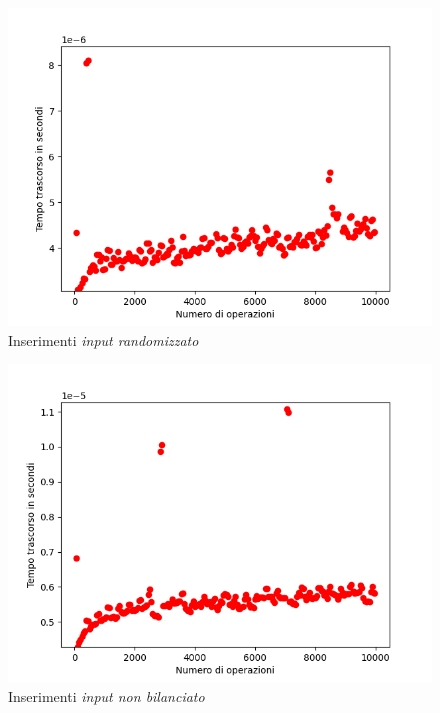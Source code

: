 \documentclass{article}
\begin{document}
			\begin{figure}[h!]
				\centering
				\includegraphics[scale = 0.8]{RBT_Insertions}
				\caption{Inserimenti \textit{input randomizzato}}
			\end{figure}
			\begin{figure}[h!]
				\centering
				\includegraphics[scale = 0.8]{RBT_Unbalanced_Insertions}
				\caption{Inserimenti \textit{input non bilanciato}}
			\end{figure}
\end{document}
